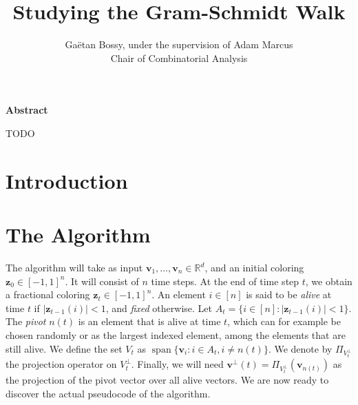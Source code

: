 \documentclass[12pt]{article}
\title{Studying the Gram-Schmidt Walk}
\author{Gaëtan Bossy, under the supervision of Adam Marcus\\Chair of Combinatorial Analysis}
\DeclareMathOperator{\Span}{span}
\begin{document}
\maketitle
\begin{center}\bf Abstract\end{center}
\small TODO


\section{Introduction}

\section{The Algorithm}
The algorithm will take as input $\textbf{v}_1,\ldots,\textbf{v}_n\in\mathbb{R}^d$, and an initial coloring $\textbf{z}_0\in[-1,1]^n$. It will consist of $n$ time steps. At the end of time step $t$, we obtain a fractional coloring $\textbf{z}_t\in[-1,1]^n$. An element $i \in [n]$ is said to be \textit{alive} at time $t$ if $|\textbf{z}_{t-1}(i)|<1$, and \textit{fixed} otherwise. Let $A_t=\{i\in[n]:|\textbf{z}_{t-1}(i)|<1\}$. The \textit{pivot} $n(t)$ is an element that is alive at time $t$, which can for example be chosen randomly or as the largest indexed element, among the elements that are still alive. We define the set $V_t$ as $\Span\{\textbf{v}_i:i\in A_t,i\not=n(t)\}$. We denote by $\Pi_{V_t^\perp}$ the projection operator on $V_t^\perp$. Finally, we will need $\textbf{v}^{\perp}(t)=\Pi_{V_t^\perp}(\textbf{v}_{n(t)})$ as the projection of the pivot vector over all alive vectors. We are now ready to discover the actual pseudocode of the algorithm.
\end{document}
